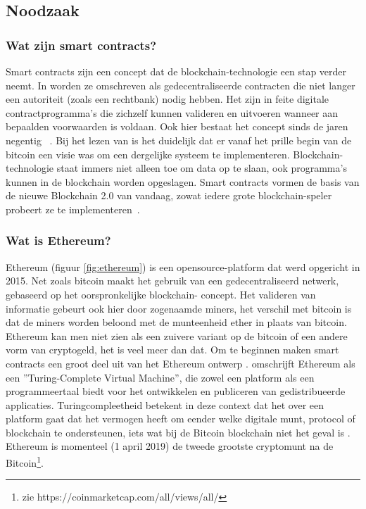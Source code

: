 	\subsection{Noodzaak}
		\subsubsection{Wat  zijn smart contracts?}
			Smart contracts zijn een concept dat de blockchain-technologie een stap verder neemt. In \textcite{Swan2015} worden ze omschreven als gedecentraliseerde contracten die niet langer een autoriteit (zoals een rechtbank) nodig hebben. Het zijn in feite digitale contractprogramma’s die zichzelf kunnen valideren en uitvoeren wanneer aan bepaalden voorwaarden is voldaan. Ook hier bestaat het concept sinds de jaren negentig ~\autocite{Szabo1996}. Bij het lezen van \textcite{Nakamoto2008} is het duidelijk dat er vanaf het prille begin van de bitcoin een visie was om een dergelijke systeem te implementeren. Blockchain-technologie staat immers niet alleen toe om data op te slaan, ook programma’s kunnen in de blockchain worden opgeslagen. Smart contracts vormen de basis van de nieuwe Blockchain 2.0 van vandaag, zowat iedere grote blockchain-speler probeert ze te implementeren~\autocite{Swan2015}.
		\subsubsection{Wat is Ethereum?}
			Ethereum (figuur \ref{fig:ethereum}) is een opensource-platform dat werd opgericht in 2015. Net zoals bitcoin maakt het gebruik van een gedecentraliseerd netwerk, gebaseerd op het oorspronkelijke blockchain- concept. Het valideren van informatie gebeurt ook hier door zogenaamde miners, het verschil met bitcoin is dat de miners worden beloond met de munteenheid ether in plaats van bitcoin. Ethereum kan men niet zien als een zuivere variant op de bitcoin of een andere vorm van cryptogeld, het is veel meer dan dat. Om te beginnen maken smart contracts  een groot deel uit van het Ethereum ontwerp . \textcite{Swan2015} omschrijft Ethereum als een ”Turing-Complete Virtual Machine”, die zowel een platform als een programmeertaal biedt voor het ontwikkelen en publiceren van gedistribueerde applicaties. Turingcompleetheid betekent in deze context dat het over een platform gaat dat het vermogen heeft om eender welke digitale munt, protocol of blockchain te ondersteunen, iets wat bij de Bitcoin blockchain niet het geval is \autocite{Swan2015}. Ethereum is momenteel (1 april 2019) de tweede grootste cryptomunt na de Bitcoin\footnote{zie https://coinmarketcap.com/all/views/all/}. 
			
